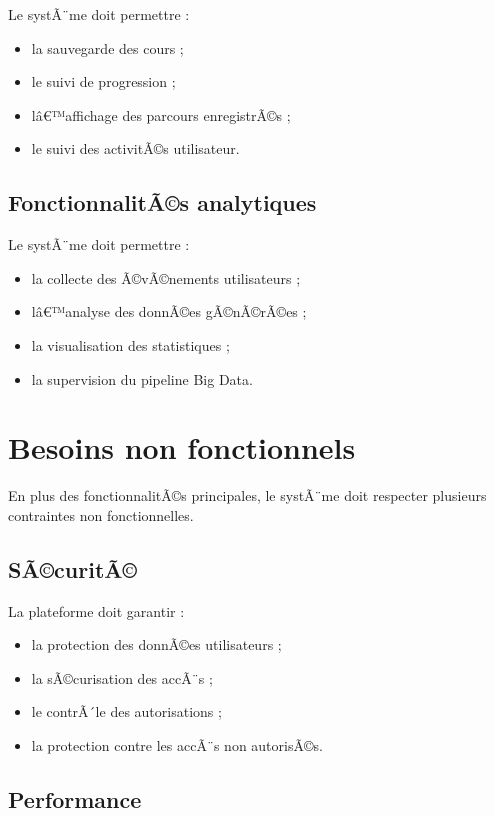 ﻿\documentclass[12pt,a4paper]{report}
\begin{document}
Le systÃ¨me doit permettre :
\begin{itemize}
    \item la sauvegarde des cours ;
    \item le suivi de progression ;
    \item lâ€™affichage des parcours enregistrÃ©s ;
    \item le suivi des activitÃ©s utilisateur.
\end{itemize}

\subsection{FonctionnalitÃ©s analytiques}

Le systÃ¨me doit permettre :
\begin{itemize}
    \item la collecte des Ã©vÃ©nements utilisateurs ;
    \item lâ€™analyse des donnÃ©es gÃ©nÃ©rÃ©es ;
    \item la visualisation des statistiques ;
    \item la supervision du pipeline Big Data.
\end{itemize}

\section{Besoins non fonctionnels}

En plus des fonctionnalitÃ©s principales, le systÃ¨me doit respecter plusieurs contraintes non fonctionnelles.

\subsection{SÃ©curitÃ©}

La plateforme doit garantir :
\begin{itemize}
    \item la protection des donnÃ©es utilisateurs ;
    \item la sÃ©curisation des accÃ¨s ;
    \item le contrÃ´le des autorisations ;
    \item la protection contre les accÃ¨s non autorisÃ©s.
\end{itemize}

\subsection{Performance}
\end{document}
